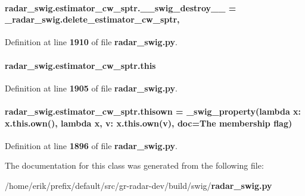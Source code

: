 \paragraph[{\+\_\+\+\_\+swig\+\_\+destroy\+\_\+\+\_\+}]{\setlength{\rightskip}{0pt plus 5cm}radar\+\_\+swig.\+estimator\+\_\+cw\+\_\+sptr.\+\_\+\+\_\+swig\+\_\+destroy\+\_\+\+\_\+ = \+\_\+radar\+\_\+swig.\+delete\+\_\+estimator\+\_\+cw\+\_\+sptr\hspace{0.3cm}{\ttfamily [static]}, {\ttfamily [private]}}\label{classradar__swig_1_1estimator__cw__sptr_ab86bd081c54b20c6d7bc13ef39655e04}


Definition at line {\bf 1910} of file {\bf radar\+\_\+swig.\+py}.

\paragraph[{this}]{\setlength{\rightskip}{0pt plus 5cm}radar\+\_\+swig.\+estimator\+\_\+cw\+\_\+sptr.\+this}\label{classradar__swig_1_1estimator__cw__sptr_a5dea3fc9b2056d2a05d7d2b8ee45d531}


Definition at line {\bf 1905} of file {\bf radar\+\_\+swig.\+py}.

\paragraph[{thisown}]{\setlength{\rightskip}{0pt plus 5cm}radar\+\_\+swig.\+estimator\+\_\+cw\+\_\+sptr.\+thisown = {\bf \+\_\+swig\+\_\+property}(lambda x\+: x.\+this.\+own(), lambda {\bf x}, v\+: x.\+this.\+own(v), doc=\textquotesingle{}The membership flag\textquotesingle{})\hspace{0.3cm}{\ttfamily [static]}}\label{classradar__swig_1_1estimator__cw__sptr_a5b373d255e31a5c7d22c4aac4515a88b}


Definition at line {\bf 1896} of file {\bf radar\+\_\+swig.\+py}.



The documentation for this class was generated from the following file\+:\begin{DoxyCompactItemize}
\item 
/home/erik/prefix/default/src/gr-\/radar-\/dev/build/swig/{\bf radar\+\_\+swig.\+py}\end{DoxyCompactItemize}
